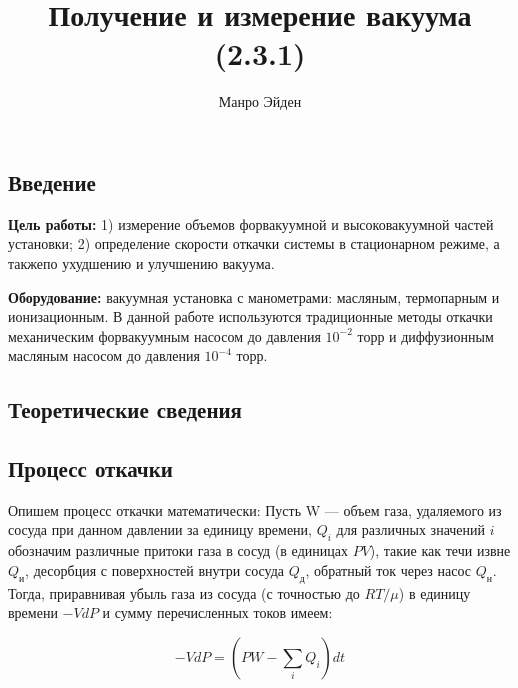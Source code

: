 \documentclass[a4paper, 12pt]{article}
\title{\textbf{Получение и измерение вакуума (2.3.1)}}
\author{Манро Эйден}
\date{}
\begin{document}
\maketitle

\begin{center}
    \section*{Введение}
\end{center}

    \noindent \textbf{Цель работы:} 1) измерение объемов форвакуумной и высоковакуумной частей установки; 2) определение скорости откачки системы в стационарном режиме, а такжепо ухудшению и улучшению вакуума.

    \bigskip

    \noindent \textbf{Оборудование:} вакуумная установка с манометрами: масляным, термопарным и ионизационным. В данной работе используются традиционные методы откачки механическим форвакуумным насосом до давления $10^{-2}$ торр и диффузионным масляным насосом до давления $10^{-4}$ торр. 

    \bigskip

\begin{center}
    \section*{Теоретические сведения}
\end{center}

  
\subsection*{Процесс откачки}

Опишем процесс откачки математически: 
Пусть W --- объем газа, удаляемого из сосуда при данном давлении за единицу времени, $Q_i$ для различных значений $i$ обозначим различные притоки газа в сосуд (в единицах $PV$), такие как течи извне $Q_\text{и}$, десорбция с поверхностей внутри сосуда $Q_\text{д}$, обратный ток через насос $Q_\text{н}$. Тогда, приравнивая убыль газа из сосуда (с точностью до $RT/\mu$) в единицу времени $-VdP$ и сумму перечисленных токов имеем:

\bigskip

\begin{equation}
    -VdP = (PW - \sum_i Q_i)dt
\end{equation}

\bigskip
\end{document}

